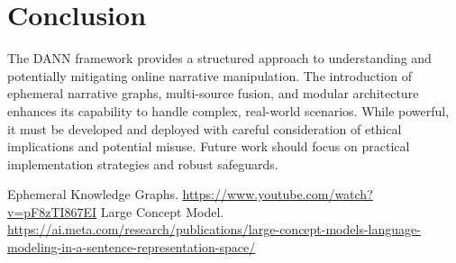 \documentclass[12pt, a4paper]{article}
\begin{document}
\section{Conclusion}
The DANN framework provides a structured approach to understanding and potentially mitigating online narrative manipulation. The introduction of ephemeral narrative graphs, multi-source fusion, and modular architecture enhances its capability to handle complex, real-world scenarios. While powerful, it must be developed and deployed with careful consideration of ethical implications and potential misuse. Future work should focus on practical implementation strategies and robust safeguards.

\begin{thebibliography}{9}
    Ephemeral Knowledge Graphs.
    \href{https://www.youtube.com/watch?v=pF8zTI867EI}{https://www.youtube.com/watch?v=pF8zTI867EI}
    Large Concept Model. 
    \href{https://ai.meta.com/research/publications/large-concept-models-language-modeling-in-a-sentence-representation-space/}{https://ai.meta.com/research/publications/large-concept-models-language-modeling-in-a-sentence-representation-space/}
\end{thebibliography}
\end{document}
